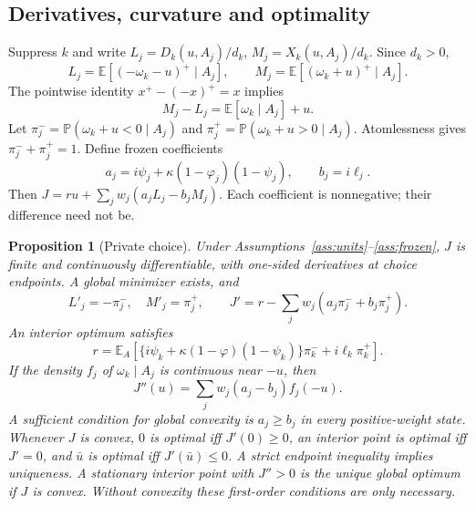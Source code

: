 \documentclass[11pt]{article}
\newtheorem{proposition}{Proposition}
\theoremstyle{definition}
\newcommand{\E}{\mathbb E}
\newcommand{\Prb}{\mathbb P}
\begin{document}
\subsection{Derivatives, curvature and optimality}
Suppress $k$ and write $L_j=D_k(u,A_j)/d_k$, $M_j=X_k(u,A_j)/d_k$. Since $d_k>0$,
\[
 L_j=\E[(-\omega_k-u)^+\mid A_j],\qquad
 M_j=\E[(\omega_k+u)^+\mid A_j].
\]
The pointwise identity $x^+-(-x)^+=x$ implies
\begin{equation}\label{eq:momentidentity}
 M_j-L_j=\E[\omega_k\mid A_j]+u.
\end{equation}
Let $\pi^-_j=\Prb(\omega_k+u<0\mid A_j)$ and $\pi^+_j=\Prb(\omega_k+u>0\mid A_j)$. Atomlessness gives $\pi^-_j+\pi^+_j=1$. Define frozen coefficients
\begin{equation}\label{eq:ab}
 a_j=i\psi_j+\kappa(1-\varphi_j)(1-\psi_j),\qquad b_j=i\ell_j .
\end{equation}
Then $J=ru+\sum_jw_j(a_jL_j-b_jM_j)$. Each coefficient is nonnegative; their difference need not be.

\begin{proposition}[Private choice]\label{prop:choice}
Under Assumptions~\ref{ass:units}--\ref{ass:frozen}, $J$ is finite and continuously differentiable, with one-sided derivatives at choice endpoints. A global minimizer exists, and
\begin{equation}\label{eq:derivatives}
 L'_j=-\pi^-_j,\quad M'_j=\pi^+_j,\qquad
 J'=r-\sum_jw_j(a_j\pi^-_j+b_j\pi^+_j).
\end{equation}
An interior optimum satisfies
\begin{equation}\label{eq:foc}
 r=\E_A[\{i\psi_k+\kappa(1-\varphi)(1-\psi_k)\}\pi_k^-+i\ell_k\pi_k^+].
\end{equation}
If the density $f_j$ of $\omega_k\mid A_j$ is continuous near $-u$, then
\begin{equation}\label{eq:curvature}
 J''(u)=\sum_jw_j(a_j-b_j)f_j(-u).
\end{equation}
A sufficient condition for global convexity is $a_j\geq b_j$ in every positive-weight state. Whenever $J$ is convex, $0$ is optimal iff $J'(0)\geq0$, an interior point is optimal iff $J'=0$, and $\bar u$ is optimal iff $J'(\bar u)\leq0$. A strict endpoint inequality implies uniqueness. A stationary interior point with $J''>0$ is the unique global optimum if $J$ is convex. Without convexity these first-order conditions are only necessary.
\end{proposition}
\end{document}
